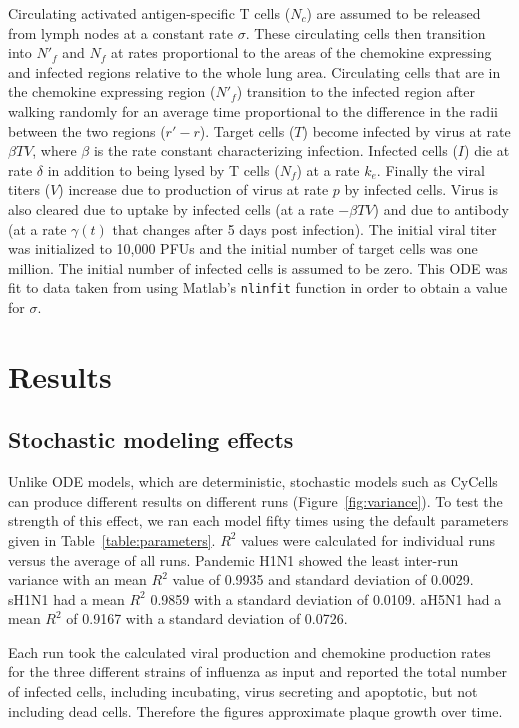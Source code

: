 \documentclass[10pt]{article}
\begin{document}
Circulating activated antigen-specific T cells ($N_{c}$) are assumed to be released from lymph nodes at a constant rate $\sigma$. These circulating cells then transition into $N'_{f}$ and $N_{f}$ at rates proportional to the areas of the chemokine expressing and infected regions relative to the whole lung area. Circulating cells that are in the chemokine expressing region ($N'_{f}$) transition to the infected region after walking randomly for an average time proportional to the difference in the radii between the two regions ($r' - r$). Target cells ($T$) become infected by virus at rate $\beta TV$, where $\beta$ is the rate constant characterizing infection. Infected cells ($I$) die at rate $\delta$ in addition to being lysed by T cells ($N_{f}$) at a rate $k_{e}$. Finally the viral titers ($V$) increase due to production of virus at rate $p$ by infected cells. Virus is also cleared due to uptake by infected cells (at a rate $- \beta TV$) and due to antibody (at a rate $\gamma (t)$ that changes after 5 days post infection). The initial viral titer was initialized to 10,000 PFUs and the initial number of target cells was one million. The initial number of infected cells is assumed to be zero. This ODE was fit to data taken from \cite{Miao2010} using Matlab's \texttt{nlinfit} function in order to obtain a value for $\sigma$.

\section{Results}

\subsection{Stochastic modeling effects}

Unlike ODE models, which are deterministic, stochastic models such as CyCells can produce different results on different runs (Figure~\ref{fig:variance}).  To test the strength of this effect, we ran each model fifty times using the default parameters given in Table~\ref{table:parameters}.  $R^2$ values were calculated for individual runs versus the average of all runs.  Pandemic H1N1 showed the least inter-run variance with an mean $R^2$ value of 0.9935 and standard deviation of 0.0029.  sH1N1 had a mean $R^2$ 0.9859 with a standard deviation of 0.0109.  aH5N1 had a mean $R^2$ of 0.9167 with a standard deviation of 0.0726.  

Each run took the calculated viral production and chemokine production rates for the three different strains of influenza as input and reported the total number of infected cells, including incubating, virus secreting and apoptotic, but not including dead cells.  Therefore the figures approximate plaque growth over time.
\end{document}

